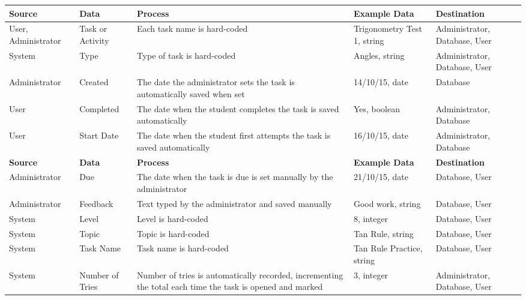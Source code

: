 \begin{center}
\begin{tabular}{|p{2.5cm}|p{2.5cm}|p{2.5cm}|p{2.5cm}|p{2.5cm}|}
\hline
\textbf{Source} & \textbf{Data} & \textbf{Process} & \textbf{Example Data} & \textbf{Destination} \\ \hline
User, Administrator & Task or Activity & Each task name is hard-coded & Trigonometry Test 1, string & Administrator, Database, User \\ \hline
System & Type & Type of task is hard-coded & Angles, string & Administrator, Database, User \\ \hline
Administrator & Created & The date the administrator sets the task is automatically saved when set & 14/10/15, date & Database \\ \hline
User & Completed & The date when the student completes the task is saved automatically & Yes, boolean & Administrator, Database \\ \hline
User & Start Date & The date when the student first attempts the task is saved automatically & 16/10/15, date & Administrator, Database \\ \hline
\textbf{Source} & \textbf{Data} & \textbf{Process} & \textbf{Example Data} & \textbf{Destination} \\ \hline
Administrator & Due & The date when the task is due is set manually by the administrator & 21/10/15, date & Database, User \\ \hline
Administrator & Feedback & Text typed by the administrator and saved manually & Good work, string & Database, User \\ \hline
System & Level & Level is hard-coded & 8, integer & Database, User \\ \hline
System & Topic & Topic is hard-coded & Tan Rule, string & Database, User \\ \hline
System & Task Name & Task name is hard-coded & Tan Rule Practice, string & Database, User \\ \hline
System & Number of Tries & Number of tries is automatically recorded, incrementing the total each time the task is opened and marked & 3, integer & Administrator, Database, User \\ \hline
\end{tabular}
\end{center}

